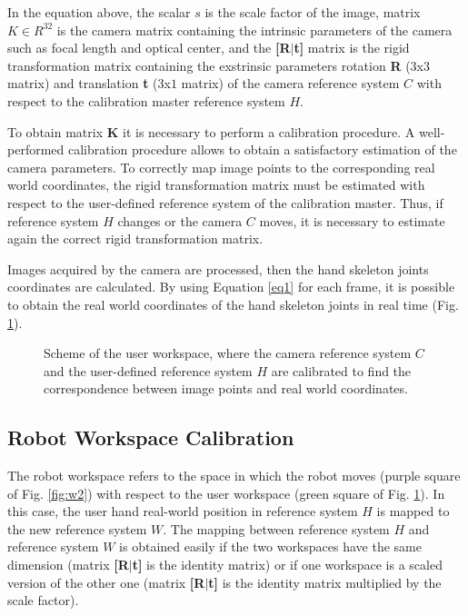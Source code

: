 \documentclass[letterpaper, 10 pt, conference]{ieeeconf}  %
\begin{document}
In the equation above, the scalar $s$ is the scale factor of the image, matrix $K\in R^32$ is the camera matrix containing the intrinsic parameters of the camera such as focal length and optical center, and the \textbf{[R$|$t]} matrix is the rigid transformation matrix containing the exstrinsic parameters rotation \textbf{R} ($3$x$3$ matrix) and translation \textbf{t} ($3$x$1$ matrix) of the camera reference system $C$ with respect to the calibration master reference system $H$.

To obtain matrix \textbf{K} it is necessary to perform a calibration procedure. A well-performed calibration procedure allows to obtain a satisfactory estimation of the camera parameters. To correctly map image points to the corresponding real world coordinates, the rigid transformation matrix must be estimated with respect to the user-defined reference system of the calibration master. Thus, if reference system $H$ changes or the camera $C$ moves, it is necessary to estimate again the correct rigid transformation matrix. %

Images acquired by the camera are processed, then the hand skeleton joints coordinates are calculated. By using Equation \ref{eq1} for each frame, it is possible to obtain the real world coordinates of the hand skeleton joints in real time (Fig. \ref{fig:w1}).

\begin{figure} [h!]
  \centering
  \caption{Scheme of the user workspace, where the camera reference system $C$ and the user-defined reference system $H$ are calibrated to find the correspondence between image points and real world coordinates.}
  \label{fig:w1}
\end{figure}


\subsection{Robot Workspace Calibration}
The robot workspace refers to the space in which the robot moves (purple square of Fig. \ref{fig:w2}) with respect to the user workspace (green square of Fig. \ref{fig:w1}). In this case, the user hand real-world position in reference system $H$ is mapped to the new reference system $W$. The mapping between reference system $H$ and reference system $W$ is obtained easily if the two workspaces have the same dimension (matrix \textbf{[R$|$t]} is the identity matrix) or if one workspace is a scaled version of the other one (matrix \textbf{[R$|$t]} is the identity matrix multiplied by the scale factor). %
\end{document}
